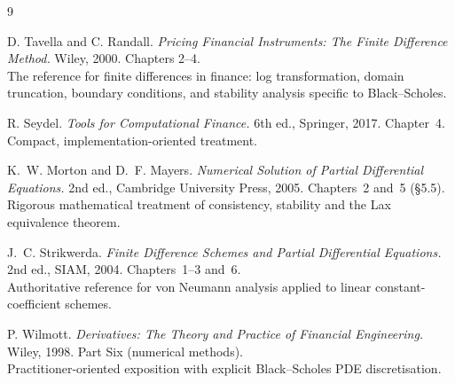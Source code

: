 \documentclass[11pt,a4paper]{article}
\begin{document}
\begin{thebibliography}{9}

D. Tavella and C. Randall.
\emph{Pricing Financial Instruments: The Finite Difference Method.}
Wiley, 2000. Chapters 2--4.\\
{\small The reference for finite differences in finance: log
transformation, domain truncation, boundary conditions, and stability
analysis specific to Black--Scholes.}

R. Seydel.
\emph{Tools for Computational Finance.}
6th ed., Springer, 2017. Chapter~4.\\
{\small Compact, implementation-oriented treatment.}

K.~W. Morton and D.~F. Mayers.
\emph{Numerical Solution of Partial Differential Equations.}
2nd ed., Cambridge University Press, 2005. Chapters~2 and~5
(\S5.5).\\
{\small Rigorous mathematical treatment of consistency, stability and
the Lax equivalence theorem.}

J.~C. Strikwerda.
\emph{Finite Difference Schemes and Partial Differential Equations.}
2nd ed., SIAM, 2004. Chapters~1--3 and~6.\\
{\small Authoritative reference for von Neumann analysis applied to
linear constant-coefficient schemes.}

P. Wilmott.
\emph{Derivatives: The Theory and Practice of Financial Engineering.}
Wiley, 1998. Part Six (numerical methods).\\
{\small Practitioner-oriented exposition with explicit Black--Scholes
PDE discretisation.}

\end{thebibliography}
\end{document}
